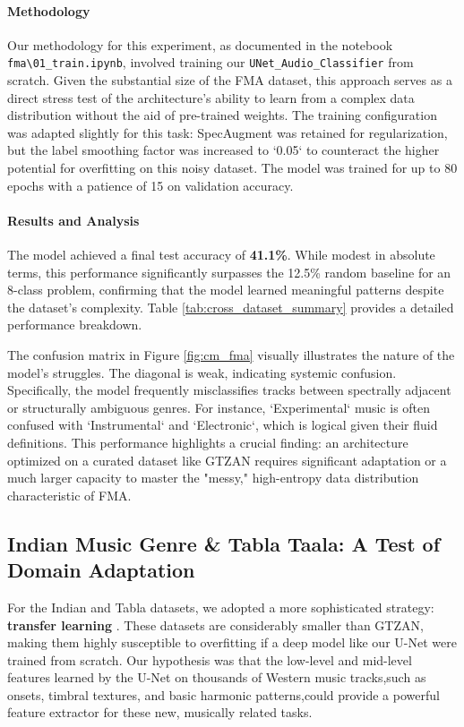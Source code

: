 \documentclass[11pt,a4paper]{article}
\begin{document}
\paragraph{Methodology}
Our methodology for this experiment, as documented in the notebook \texttt{fma\textbackslash01\_train.ipynb}, involved training our \texttt{UNet\_Audio\_Classifier} from scratch. Given the substantial size of the FMA dataset, this approach serves as a direct stress test of the architecture's ability to learn from a complex data distribution without the aid of pre-trained weights. The training configuration was adapted slightly for this task: SpecAugment was retained for regularization, but the label smoothing factor was increased to `0.05` to counteract the higher potential for overfitting on this noisy dataset. The model was trained for up to 80 epochs with a patience of 15 on validation accuracy.

\paragraph{Results and Analysis}
The model achieved a final test accuracy of \textbf{41.1\%}. While modest in absolute terms, this performance significantly surpasses the 12.5\% random baseline for an 8-class problem, confirming that the model learned meaningful patterns despite the dataset's complexity. Table \ref{tab:cross_dataset_summary} provides a detailed performance breakdown.

The confusion matrix in Figure \ref{fig:cm_fma} visually illustrates the nature of the model's struggles. The diagonal is weak, indicating systemic confusion. Specifically, the model frequently misclassifies tracks between spectrally adjacent or structurally ambiguous genres. For instance, `Experimental` music is often confused with `Instrumental` and `Electronic`, which is logical given their fluid definitions. This performance highlights a crucial finding: an architecture optimized on a curated dataset like GTZAN requires significant adaptation or a much larger capacity to master the "messy," high-entropy data distribution characteristic of FMA.

\subsection{Indian Music Genre \& Tabla Taala: A Test of Domain Adaptation}

For the Indian and Tabla datasets, we adopted a more sophisticated strategy: \textbf{transfer learning} \textbf{\cite{choi2017transfer}}. %
These datasets are considerably smaller than GTZAN, making them highly susceptible to overfitting if a deep model like our U-Net were trained from scratch. Our hypothesis was that the low-level and mid-level features learned by the U-Net on thousands of Western music tracks,such as onsets, timbral textures, and basic harmonic patterns,could provide a powerful feature extractor for these new, musically related tasks.
\end{document}
